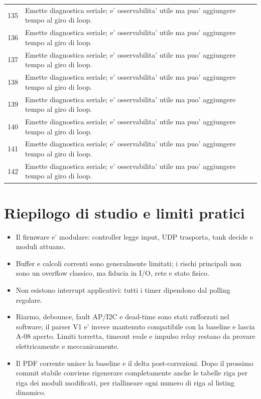 \documentclass[11pt,a4paper]{article}
\begin{document}
\begin{longtable}{p{}p{}}
135 & Emette diagnostica seriale; e' osservabilita' utile ma puo' aggiungere tempo al giro di loop. \\
136 & Emette diagnostica seriale; e' osservabilita' utile ma puo' aggiungere tempo al giro di loop. \\
137 & Emette diagnostica seriale; e' osservabilita' utile ma puo' aggiungere tempo al giro di loop. \\
138 & Emette diagnostica seriale; e' osservabilita' utile ma puo' aggiungere tempo al giro di loop. \\
139 & Emette diagnostica seriale; e' osservabilita' utile ma puo' aggiungere tempo al giro di loop. \\
140 & Emette diagnostica seriale; e' osservabilita' utile ma puo' aggiungere tempo al giro di loop. \\
141 & Emette diagnostica seriale; e' osservabilita' utile ma puo' aggiungere tempo al giro di loop. \\
142 & Emette diagnostica seriale; e' osservabilita' utile ma puo' aggiungere tempo al giro di loop. \\
\bottomrule
\end{longtable}


\section{Riepilogo di studio e limiti pratici}

\begin{itemize}
\item Il firmware e' modulare: controller legge input, UDP trasporta, tank decide e moduli attuano.
\item Buffer e calcoli correnti sono generalmente limitati; i rischi principali non sono un overflow classico, ma fiducia in I/O, rete e stato fisico.
\item Non esistono interrupt applicativi: tutti i timer dipendono dal polling regolare.
\item Riarmo, debounce, fault AP/I2C e dead-time sono stati rafforzati nel software; il parser V1 e' invece mantenuto compatibile con la baseline e lascia A-08 aperto. Limiti torretta, timeout reale e impulso relay restano da provare elettricamente e meccanicamente.
\item Il PDF corrente unisce la baseline e il delta post-correzioni. Dopo il prossimo commit stabile conviene rigenerare completamente anche le tabelle riga per riga dei moduli modificati, per riallineare ogni numero di riga al listing dinamico.
\end{itemize}

\thispagestyle{fancy}
\end{document}
